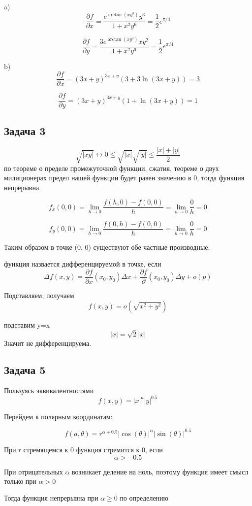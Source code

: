 \documentclass[a4paper,12pt]{article}
\begin{document}
a)
\[
\frac{\partial f}{\partial x} = \frac{e^{\arctan(xy^3)}y^3}{1+x^2y^6}= \frac{1}{2} e^{\pi/4}
\]

\[
\frac{\partial f}{\partial y} = \frac{3e^{\arctan(xy^3)}xy^2}{1+x^2y^6} = \frac{1}{2} e^{\pi/4}
\]

b)
\[
\frac{\partial f}{\partial x} = (3x+y)^{3x+y}(3+3\ln(3x+y)) = 3
\]

\[
\frac{\partial f}{\partial y} = (3x+y)^{3x+y}(1+\ln(3x+y)) = 1
\]

\subsection{Задача 3}

\[
\sqrt{|xy|} \leftrightarrow 0 \le \sqrt{|x|}\sqrt{|y|} \le \frac{|x|+|y|}{2}
\]
по теореме о пределе промежуточной функции, сжатия, теореме о двух милиционерах предел нашей функции будет равен значению в 0, тогда функция непрерывна.


\[
f_x(0, 0) = \lim_{h \to 0} \frac{f(h, 0)-f(0, 0)}{h} = \lim_{h \to 0}\frac{0}{h} = 0
\]

\[
f_y(0, 0) = \lim_{h \to 0} \frac{f(0, h)-f(0, 0)}{h} = \lim_{h \to 0}\frac{0}{h} = 0
\]

Таким образом в точке (0, 0) существуют обе частные производные.

функция назвается дифференцируемой в точке, если 
\[
\Delta f(x, y) = \frac{\partial f}{\partial x}(x_0, y_0)\Delta x + \frac{\partial f}{\partial }(x_0, y_0)\Delta y + o(p)
\]

Подставляем, получаем
\[
f(x, y) = o(\sqrt{x^2+y^2})
\]

подставим y=x
\[
|x| = \sqrt{2}|x|
\]
Значит не дифференцируема.


\subsection{Задача 5}

Пользуясь эквивалентностями
\[
f(x, y) = |x|^a|y|^{0.5}
\]

Перейдем к полярным координатам: 

\[
f(a, \theta) = r^{\alpha+0.5}|\cos(\theta)|^\alpha|\sin(\theta)|^{0.5}
\]

При r стремящемся к 0 функция стремится к 0, если 
\[
\alpha > -0.5
\]

При отрицательных $\alpha$ возникает деление на ноль, поэтому  функция имеет смысл только при $\alpha > 0$

Тогда функция непрерывна при $\alpha \ge 0$ по определению
\end{document}
